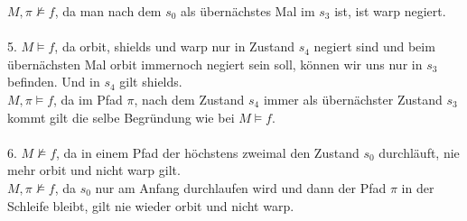 \documentclass[a4paper,12pt]{scrartcl}
\begin{document}
$M,\pi\nvDash f$, da man nach dem $s_0$ als übernächstes Mal im $s_3$ ist, ist warp negiert.\\\\
5. $M\vDash f$, da orbit, shields und warp nur in Zustand $s_4$ negiert sind und beim übernächsten Mal orbit immernoch negiert sein soll, können wir uns nur in $s_3$ befinden. Und in $s_4$ gilt shields.\\
$M,\pi\vDash f$, da im Pfad $\pi$, nach dem Zustand $s_4$ immer als übernächster Zustand $s_3$ kommt gilt die selbe Begründung wie bei $M\vDash f$.\\\\
6. $M\nvDash f$, da in einem Pfad der höchstens zweimal den Zustand $s_0$ durchläuft, nie mehr orbit und nicht warp gilt.\\
$M,\pi\nvDash f$, da $s_0$ nur am Anfang durchlaufen wird und dann der Pfad $\pi$ in der Schleife bleibt, gilt nie wieder orbit und nicht warp.
\end{document}
